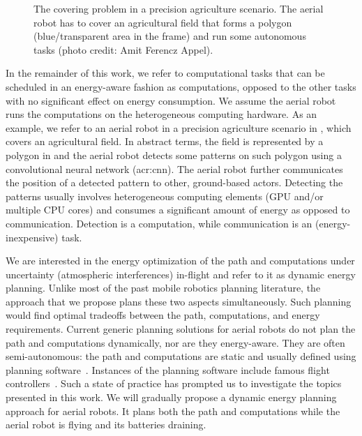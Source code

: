 \begin{figure}[t!]
  \centering
  
  \caption[The covering problem in a precision agriculture scenario]{The covering problem in a precision agriculture scenario. The aerial robot has to cover an agricultural field that forms a polygon (blue/transparent area in the frame) and run some autonomous tasks {\scriptsize(photo credit: Amit Ferencz Appel)}.}
  \label{fig:plot2}
\end{figure}

In the remainder of this work, we refer to computational tasks that can be scheduled in an energy-aware fashion as computations, opposed to the other tasks with no significant effect on energy consumption. We assume the aerial robot runs the computations on the heterogeneous computing hardware. As an example, we refer to an aerial robot in a precision agriculture scenario in , which covers an agricultural field. In abstract terms, the field is represented by a polygon in  and the aerial robot detects some patterns on such polygon using a convolutional neural network (\Gls{acr:cnn}). The aerial robot further communicates the position of a detected pattern to other, ground-based actors. Detecting the patterns usually involves heterogeneous computing elements (GPU and/or multiple CPU cores) and consumes a significant amount of energy as opposed to communication. Detection is a computation, while communication is an (energy-inexpensive) task.

We are interested in the energy optimization of the path and computations under uncertainty (atmospheric interferences) in-flight and refer to it as dynamic energy planning. Unlike most of the past mobile robotics planning literature, the approach that we propose plans these two aspects simultaneously. Such planning would find optimal tradeoffs between the path, computations, and energy requirements. Current generic planning solutions for aerial robots do not plan the path and computations dynamically, nor are they energy-aware. They are often semi-autonomous: the path and computations are static and usually defined using planning software~\citep{daponte2019review}. Instances of the planning software include famous flight controllers~\citep{px4,papa}. Such a state of practice has prompted us to investigate the topics presented in this work. We will gradually propose a dynamic energy planning approach for aerial robots. It plans both the path and computations while the aerial robot is flying and its batteries draining. 

